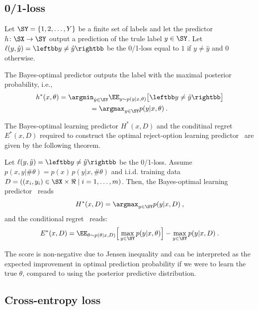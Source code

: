 
\subsection{0/1-loss} 
Let $\SY=\{1,2,\ldots,Y\}$ be a finite set of labels and let the predictor $h\colon\SX\rightarrow \SY$ output a prediction of the trule label $y\in\SY$. Let $\ell(y,\hat{y})=\leftbb y\neq \hat{y}\rightbb$ be the 0/1-loss equal to $1$ if $y\neq\hat{y}$ and $0$ otherwise.

The Bayes-optimal predictor outputs the label with the maximal posterior probability, i.e.,
\begin{multline}
  h^*(x,\theta) = 
  \argmin_{\hat{y}\in\SY} \EE_{y\sim p(y|x,\theta)}\big [\leftbb y\neq \hat{y}\rightbb\big ] \\= \argmax_{y\in\SY} p(y|x,\theta )\:.  %
\end{multline}


The Bayes-optimal learning predictor $H^*(x,D)$ and the conditinal regret $E^*(x,D)$ required to construct the optimal reject-option learning predictor~ are given by the following theorem.


\begin{theorem}
Let $\ell(y,\hat{y})=\leftbb y\neq \hat{y}\rightbb$ be the 0/1-loss. 
Assume $p(x,y|\#\theta)=p(x)\,p(y|x,\#\theta)$ and i.i.d. training data $D=((x_i,y_i)\in\SX\times\Re\mid i=1,\ldots,m)$. Then, the Bayes-optimal learning predictor~ reads
\[
   H^*(x,D) = \argmax_{y\in\SY} p(y|x,D) \:,
\]
and the conditional regret~ reads:
\[
   E^*(x,D) = \EE_{\theta\sim p(\theta|x,D)}\Big[ \max_{y\in\SY} p(y|x,\theta)\Big ] - \max_{y\in\SY} p(y|x,D) \:.
\]
\end{theorem}
The score is non-negative due to Jensen inequality and can be interpreted as the expected improvement in optimal prediction probability if we were to learn the true $\theta$, compared to using the posterior predictive distribution. 


\subsection{Cross-entropy loss}

